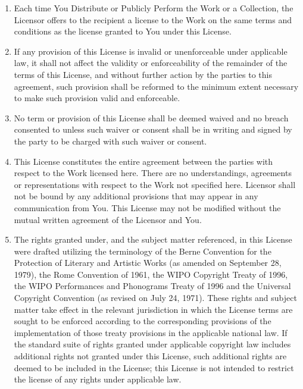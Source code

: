 \begin{enumerate}
  \item Each time You Distribute or Publicly Perform the Work or a Collection, the Licensor offers to the recipient a license to the Work on the same terms and conditions as the license granted to You under this License.
  \item If any provision of this License is invalid or unenforceable under applicable law, it shall not affect the validity or enforceability of the remainder of the terms of this License, and without further action by the parties to this agreement, such provision shall be reformed to the minimum extent necessary to make such provision valid and enforceable.
  \item No term or provision of this License shall be deemed waived and no breach consented to unless such waiver or consent shall be in writing and signed by the party to be charged with such waiver or consent.
  \item This License constitutes the entire agreement between the parties with respect to the Work licensed here. There are no understandings, agreements or representations with respect to the Work not specified here. Licensor shall not be bound by any additional provisions that may appear in any communication from You. This License may not be modified without the mutual written agreement of the Licensor and You.
  \item The rights granted under, and the subject matter referenced, in this License were drafted utilizing the terminology of the Berne Convention for the Protection of Literary and Artistic Works (as amended on September 28, 1979), the Rome Convention of 1961, the WIPO Copyright Treaty of 1996, the WIPO Performances and Phonograms Treaty of 1996 and the Universal Copyright Convention (as revised on July 24, 1971). These rights and subject matter take effect in the relevant jurisdiction in which the License terms are sought to be enforced according to the corresponding provisions of the implementation of those treaty provisions in the applicable national law. If the standard suite of rights granted under applicable copyright law includes additional rights not granted under this License, such additional rights are deemed to be included in the License; this License is not intended to restrict the license of any rights under applicable law.
\end{enumerate}

